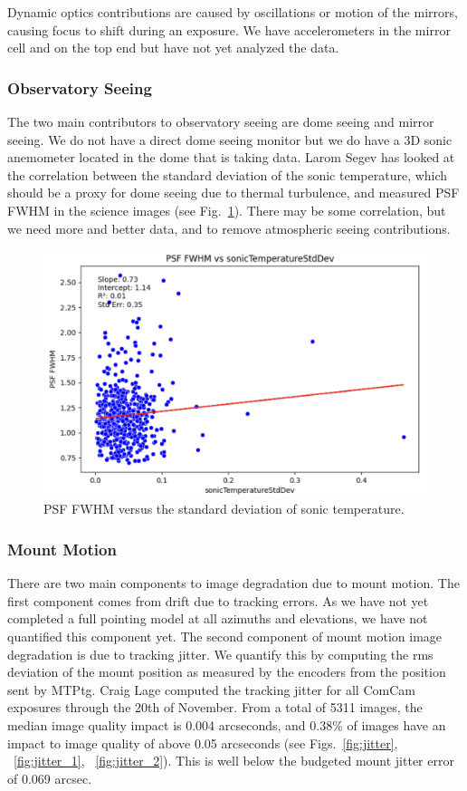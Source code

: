 Dynamic optics contributions are caused by oscillations or motion of the mirrors, causing focus to shift during an exposure. We have accelerometers in the mirror cell and on the top end but have not yet analyzed the data.

\subsubsection{Observatory Seeing}

The two main contributors to observatory seeing are dome seeing and mirror seeing. We do not have a direct dome seeing monitor but we do have a 3D sonic anemometer located in the dome that is taking data. Larom Segev has looked at the correlation between the standard deviation of the sonic temperature, which should be a proxy for dome seeing due to thermal turbulence, and measured PSF FWHM in the science images (see Fig.~\ref{fig:anemometer}). There may be some correlation, but we need more and better data, and to remove atmospheric seeing contributions.

\begin{figure}
    \includegraphics[width=\linewidth]{image_quality_figures/anemometer_PSF.png}
    \caption{PSF FWHM versus the standard deviation of sonic temperature.}
    \label{fig:anemometer}
\end{figure}

\subsubsection{Mount Motion}

There are two main components to image degradation due to mount motion. The first component comes from drift due to tracking errors. As we have not yet completed a full pointing model at all azimuths and elevations, we have not quantified this component yet. The second component of mount motion image degradation is due to tracking jitter. We quantify this by computing the rms deviation of the mount position as measured by the encoders from the position sent by MTPtg. Craig Lage computed the tracking jitter for all ComCam exposures through the 20th of November. From a total of 5311 images, the median image quality impact is 0.004 arcseconds, and 0.38\% of images have an impact to image quality of above 0.05 arcseconds (see Figs.~\ref{fig:jitter}, ~\ref{fig:jitter_1}, ~\ref{fig:jitter_2}). This is well below the budgeted mount jitter error of 0.069 arcsec.

